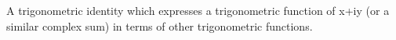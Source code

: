A trigonometric identity which expresses a trigonometric function
of x+iy (or a similar complex sum) in terms of other trigonometric functions.